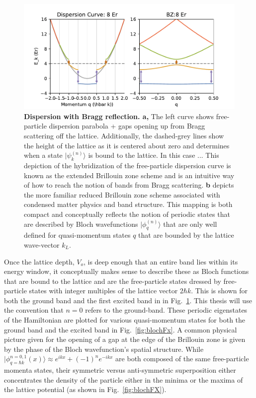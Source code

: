 \begin{figure}[ht!]
		\includegraphics[width=\columnwidth]{figures/ch1/BandStructure/BZ_BS.pdf} 
		\caption{\textbf{Dispersion with Bragg reflection. a,}  The left curve shows free-particle dispersion parabola + gaps opening up from Bragg scattering off the lattice. Additionally, the dashed-grey lines show the height of the lattice as it is centered about zero and determines when a state $| \psi_k^{(n)} \rangle$ is bound to the lattice. In this case ...  This depiction of the hybridization of the free-particle dispersion curve is known as the extended Brillouin zone scheme and is an intuitive way of how to reach the notion of bands from Bragg scattering.  \textbf{b} depicts the more familiar reduced Brillouin zone scheme associated with condensed matter physics and band structure. This mapping is both compact and conceptually reflects the notion of periodic states that are described by Bloch wavefunctions $| \phi_q^{(n)} \rangle$ that are only well defined for quasi-momentum states $q$ that are bounded by the lattice wave-vector $k_L$.}
		\label{fig:freePartBS}	
\end{figure}

Once the lattice depth, $V_o$, is deep enough that an entire band lies within its energy window, it conceptually makes sense to describe these as Bloch functions that are bound to the lattice and are the free-particle states dressed by free-particle states with integer multiples of the lattice vector $2\hbar k$. This is shown for both the ground band and the first excited band in in Fig.~\ref{fig:freePartBS}. This thesis will use the convention that $n=0$ refers to the ground-band. These periodic eigenstates of the Hamiltonian are plotted for various quasi-momentum states for both the ground band and the excited band in Fig.~\ref{fig:blochFx}.  A common physical picture given for the opening of a gap at the edge of the Brillouin zone is given by the phase of the Bloch wavefunction's spatial structure. While $| \phi_{q=\hbar k}^{n=0,1} (x) \rangle \approx e^{i k x} + (-1)^n e^{-i k x}$  are both composed of the same free-particle momenta states, their symmetric versus anti-symmetric superposition either concentrates the density of the particle either in the minima or the maxima of the lattice potential (as shown in Fig.~\ref{fig:blochFX}).

